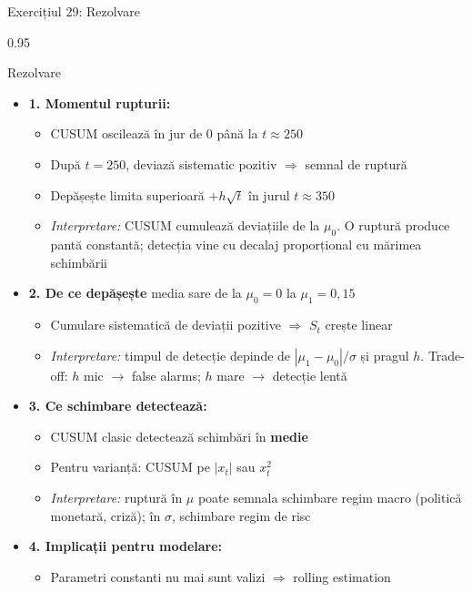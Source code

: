\documentclass[9pt, aspectratio=169, t]{beamer}
\begin{document}
\begin{frame}[shrink=30]{Exercițiul 29: Rezolvare}
\begin{cminipage}{0.95\textwidth}
\begin{exampleblock}{Rezolvare}
\begin{itemize}\setlength{\itemsep}{0pt}
    \item \textbf{1. Momentul rupturii:}
    \begin{itemize}\setlength{\itemsep}{0pt}
        \item CUSUM oscilează în jur de 0 până la $t \approx 250$
        \item După $t = 250$, deviază sistematic pozitiv $\Rightarrow$ semnal de ruptură
        \item Depășește limita superioară $+h\sqrt{t}$ în jurul $t \approx 350$
        \item \textit{Interpretare:} CUSUM cumulează deviațiile de la $\mu_0$. O ruptură produce pantă constantă; detecția vine cu decalaj proporțional cu mărimea schimbării
    \end{itemize}
    \item \textbf{2. De ce depășește} \quad media sare de la $\mu_0 = 0$ la $\mu_1 = 0{,}15$
    \begin{itemize}\setlength{\itemsep}{0pt}
        \item Cumulare sistematică de deviații pozitive $\Rightarrow$ $S_t$ crește linear
        \item \textit{Interpretare:} timpul de detecție depinde de $|\mu_1 - \mu_0|/\sigma$ și pragul $h$. Trade-off: $h$ mic $\to$ false alarms; $h$ mare $\to$ detecție lentă
    \end{itemize}
    \item \textbf{3. Ce schimbare detectează:}
    \begin{itemize}\setlength{\itemsep}{0pt}
        \item CUSUM clasic detectează schimbări în \textbf{medie}
        \item Pentru varianță: CUSUM pe $|x_t|$ sau $x_t^2$
        \item \textit{Interpretare:} ruptură în $\mu$ poate semnala schimbare regim macro (politică monetară, criză); în $\sigma$, schimbare regim de risc
    \end{itemize}
    \item \textbf{4. Implicații pentru modelare:}
    \begin{itemize}\setlength{\itemsep}{0pt}
        \item Parametri constanti nu mai sunt valizi $\Rightarrow$ rolling estimation

\end{itemize}
\end{itemize}
\end{exampleblock}
\end{cminipage}
\end{frame}
\end{document}
